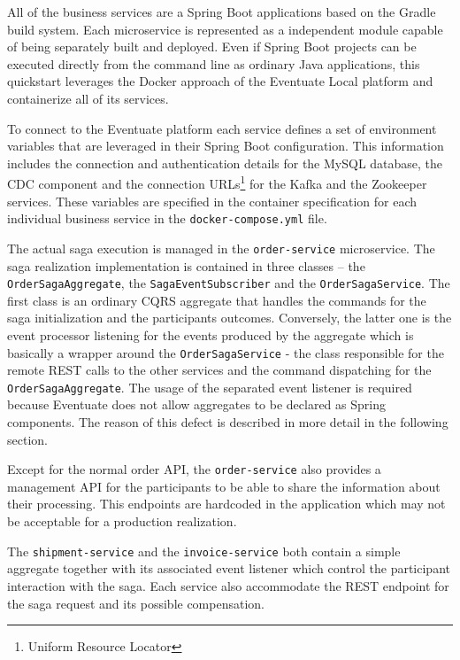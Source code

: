 \documentclass[oneside,
  digital, %
  table,   %
  nolof,     %
  nolot,     %
]{fithesis3}
\begin{document}
All of the business services are a Spring Boot applications based on the Gradle \cite{gradle} build system. Each microservice is represented as a independent module capable of being separately built and deployed. Even if Spring Boot projects can be executed directly from the command line as ordinary Java applications, this quickstart leverages the Docker approach of the Eventuate Local platform and containerize all of its services.

To connect to the Eventuate platform each service defines a set of environment variables that are leveraged in their Spring Boot configuration. This information includes the connection and authentication details for the MySQL database, the CDC component and the connection URLs\footnote{Uniform Resource Locator} for the Kafka and the Zookeeper services. These variables are specified in the container specification for each individual business service in the \texttt{docker-compose.yml} file.

The actual saga execution is managed in the \texttt{order-service} microservice. The saga realization implementation is contained in three classes -- the \texttt{OrderSagaAggregate}, the \texttt{SagaEventSubscriber} and the \texttt{OrderSagaService}. The first class is an ordinary CQRS aggregate that handles the commands for the saga initialization and the participants outcomes. Conversely, the latter one is the event processor listening for the events produced by the aggregate which is basically a wrapper around the \texttt{OrderSagaService} - the class responsible for the remote REST calls to the other services and the command dispatching for the \texttt{OrderSagaAggregate}. The usage of the separated event listener is required because Eventuate does not allow aggregates to be declared as Spring components. The reason of this defect is described in more detail in the following section.

Except for the normal order API, the \texttt{order-service} also provides a management API for the participants to be able to share the information about their processing. This endpoints are hardcoded in the application which may not be acceptable for a production realization.

The \texttt{shipment-service} and the \texttt{invoice-service} both contain a simple aggregate together with its associated event listener which control the participant interaction with the saga. Each service also accommodate the REST endpoint for the saga request and its possible compensation.
\end{document}
